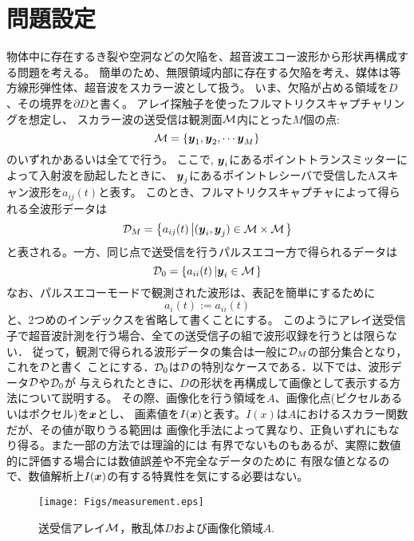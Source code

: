 \documentclass[10pt,a4j,dvipdfmx]{jarticle}
\begin{document}
\section{問題設定}
物体中に存在するき裂や空洞などの欠陥を、超音波エコー波形から形状再構成する問題を考える。
簡単のため、無限領域内部に存在する欠陥を考え、媒体は等方線形弾性体、超音波をスカラー波として扱う。
いま、欠陥が占める領域を$D$、その境界を$\partial D$と書く。
アレイ探触子を使ったフルマトリクスキャプチャリングを想定し、
スカラー波の送受信は観測面$\cal M$内にとった$M$個の点:
\begin{equation}
	{\cal M} =\left\{ 
		\mbox{\boldmath $y$}_1, \mbox{\boldmath $y$}_2, \cdots \mbox{\boldmath $y$}_M
	\right\}
	\label{eqn:}
\end{equation}
のいずれかあるいは全てで行う。
ここで, $\mbox{\boldmath $y$}_i$にあるポイントトランスミッターによって入射波を励起したときに、
$\mbox{\boldmath $y$}_j$にあるポイントレシーバで受信したAスキャン波形を$a_{ij}(t)$と表す。
このとき、フルマトリクスキャプチャによって得られる全波形データは
\begin{equation}
	{\cal D}_M= \left\{ a_{ij}(t) \left| (\mbox{\boldmath $y$}_i,\mbox{\boldmath $y$}_j)  \in {\cal M}\times {\cal M} \right.\right\}
	\label{eqn:full_mat}
\end{equation}
と表される。一方、同じ点で送受信を行うパルスエコー方で得られるデータは
\begin{equation}
	{\cal D}_0= \left\{ a_{ii}(t) \left| \mbox{\boldmath $y$}_i \in {\cal M}\right.\right\}
	\label{eqn:pulse_echo}
\end{equation}
なお、パルスエコーモードで観測された波形は、表記を簡単にするために
\begin{equation}
	a_i(t):=a_{ii}(t)
	\label{eqn:}
\end{equation}
と、2つめのインデックスを省略して書くことにする。
このようにアレイ送受信子で超音波計測を行う場合、全ての送受信子の組で波形収録を行うとは限らない．
従って，観測で得られる波形データの集合は一般に${\cal D}_M$の部分集合となり，これを$\cal D$と書く
ことにする．${\cal D}_0$は$\cal D$の特別なケースである．以下では、波形データ$\cal D$や${\cal D}_0$が
与えられたときに、$D$の形状を再構成して画像として表示する方法について説明する。
その際、画像化を行う領域を$A$、画像化点(ピクセルあるいはボクセル)を$\mbox{\boldmath $x$}$とし、
画素値を$I(\mbox{\boldmath $x$})$と表す。$I(x)$は$A$におけるスカラー関数だが、その値が取りうる範囲は
画像化手法によって異なり、正負いずれにもなり得る。また一部の方法では理論的には
有界でないものもあるが、実際に数値的に評価する場合には数値誤差や不完全なデータのために
有限な値となるので、数値解析上$I(\mbox{\boldmath $x$})$の有する特異性を気にする必要はない。
\begin{figure}[h]
	\begin{center}
	\texttt{[image: Figs/measurement.eps]} 
	\end{center}
	\caption{送受信アレイ$\cal M$，散乱体$D$および画像化領域$A$.} 
	\label{fig:arrayM}
\end{figure}
\end{document}
